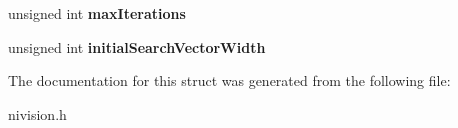 \begin{DoxyCompactItemize}
\item 
\hypertarget{structDataMatrixSearchOptions__struct_a54912320e59539d026ded707edb66ec5}{unsigned int {\bfseries max\-Iterations}}\label{structDataMatrixSearchOptions__struct_a54912320e59539d026ded707edb66ec5}

\item 
\hypertarget{structDataMatrixSearchOptions__struct_a65dab3cbd45a4a6c351c1b628867327a}{unsigned int {\bfseries initial\-Search\-Vector\-Width}}\label{structDataMatrixSearchOptions__struct_a65dab3cbd45a4a6c351c1b628867327a}

\end{DoxyCompactItemize}


\-The documentation for this struct was generated from the following file\-:\begin{DoxyCompactItemize}
\item 
nivision.\-h\end{DoxyCompactItemize}
